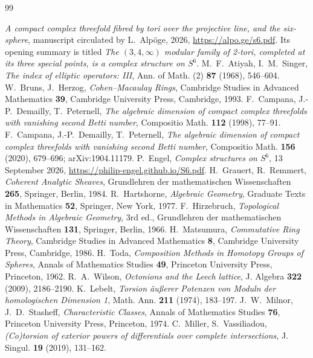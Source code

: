 \begin{thebibliography}{99}
\small\raggedright
{} \emph{A compact complex threefold fibred by tori over the projective line, and the six-sphere}, manuscript circulated by L.~Alpöge, 2026, \url{https://alpo.ge/s6.pdf}. Its opening summary is titled \emph{The $(3,4,\infty)$ modular family of 2-tori, completed at its three special points, is a complex structure on $S^6$}.
 M.~F.~Atiyah, I.~M.~Singer, \emph{The index of elliptic operators: III}, Ann. of Math. (2) \textbf{87} (1968), 546--604.
 W.~Bruns, J.~Herzog, \emph{Cohen--Macaulay Rings}, Cambridge Studies in Advanced Mathematics \textbf{39}, Cambridge University Press, Cambridge, 1993.
 F.~Campana, J.-P.~Demailly, T.~Peternell, \emph{The algebraic dimension of compact complex threefolds with vanishing second Betti number}, Compositio Math. \textbf{112} (1998), 77--91.
 F.~Campana, J.-P.~Demailly, T.~Peternell, \emph{The algebraic dimension of compact complex threefolds with vanishing second Betti number}, Compositio Math. \textbf{156} (2020), 679--696; arXiv:1904.11179.
 P.~Engel, \emph{Complex structures on $S^6$}, 13 September 2026, \url{https://philip-engel.github.io/S6.pdf}.
 H.~Grauert, R.~Remmert, \emph{Coherent Analytic Sheaves}, Grundlehren der mathematischen Wissenschaften \textbf{265}, Springer, Berlin, 1984.
 R.~Hartshorne, \emph{Algebraic Geometry}, Graduate Texts in Mathematics \textbf{52}, Springer, New York, 1977.
 F.~Hirzebruch, \emph{Topological Methods in Algebraic Geometry}, 3rd ed., Grundlehren der mathematischen Wissenschaften \textbf{131}, Springer, Berlin, 1966.
 H.~Matsumura, \emph{Commutative Ring Theory}, Cambridge Studies in Advanced Mathematics \textbf{8}, Cambridge University Press, Cambridge, 1986.
 H.~Toda, \emph{Composition Methods in Homotopy Groups of Spheres}, Annals of Mathematics Studies \textbf{49}, Princeton University Press, Princeton, 1962.
 R.~A.~Wilson, \emph{Octonions and the Leech lattice}, J. Algebra \textbf{322} (2009), 2186--2190.
 K.~Lebelt, \emph{Torsion äußerer Potenzen von Moduln der homologischen Dimension 1}, Math. Ann. \textbf{211} (1974), 183--197.
 J.~W.~Milnor, J.~D.~Stasheff, \emph{Characteristic Classes}, Annals of Mathematics Studies \textbf{76}, Princeton University Press, Princeton, 1974.
 C.~Miller, S.~Vassiliadou, \emph{(Co)torsion of exterior powers of differentials over complete intersections}, J. Singul. \textbf{19} (2019), 131--162.

\end{thebibliography}
